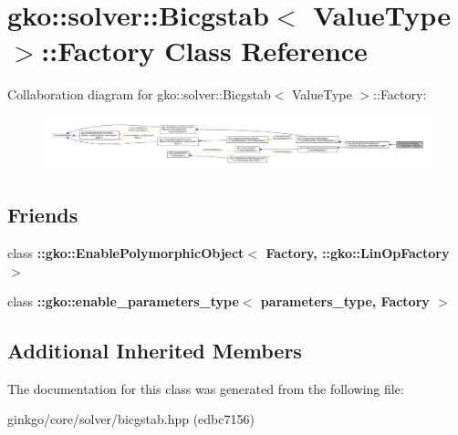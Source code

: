 \hypertarget{classgko_1_1solver_1_1Bicgstab_1_1Factory}{}\section{gko\+:\+:solver\+:\+:Bicgstab$<$ Value\+Type $>$\+:\+:Factory Class Reference}
\label{classgko_1_1solver_1_1Bicgstab_1_1Factory}


Collaboration diagram for gko\+:\+:solver\+:\+:Bicgstab$<$ Value\+Type $>$\+:\+:Factory\+:
\nopagebreak
\begin{figure}[H]
\begin{center}
\leavevmode
\includegraphics[width=350pt]{classgko_1_1solver_1_1Bicgstab_1_1Factory__coll__graph}
\end{center}
\end{figure}
\subsection*{Friends}
\begin{DoxyCompactItemize}
\item 
\mbox{\label{classgko_1_1solver_1_1Bicgstab_1_1Factory_a27e9bbc94a1c1c59f40833153eda8f78}} 
class {\bfseries \+::gko\+::\+Enable\+Polymorphic\+Object$<$ Factory, \+::gko\+::\+Lin\+Op\+Factory $>$}
\item 
\mbox{\label{classgko_1_1solver_1_1Bicgstab_1_1Factory_a0d176cbd42d6214e11aee8c30ca256fc}} 
class {\bfseries \+::gko\+::enable\+\_\+parameters\+\_\+type$<$ parameters\+\_\+type, Factory $>$}
\end{DoxyCompactItemize}
\subsection*{Additional Inherited Members}


The documentation for this class was generated from the following file\+:\begin{DoxyCompactItemize}
\item 
ginkgo/core/solver/bicgstab.\+hpp (edbc7156)\end{DoxyCompactItemize}
